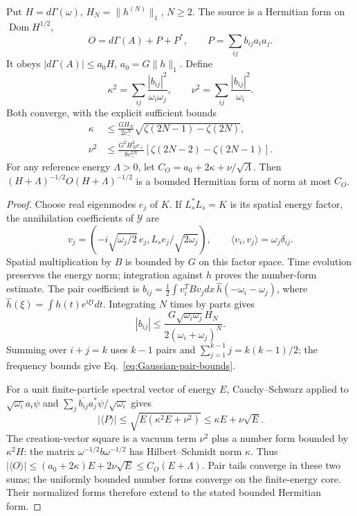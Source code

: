 \begin{proposition}
\label{prop:Gaussian-source-certificate}
Put $H=d\Gamma(\omega)$, $H_N=\|h^{(N)}\|_1$, $N\ge2$.
The source is a Hermitian form on $\operatorname{Dom}H^{1/2}$,
\[
 O=d\Gamma(A)+P+P^*,\qquad P=\sum_{ij}b_{ij}a_i a_j.
\]
It obeys $|d\Gamma(A)|\le a_0H$, $a_0=G\|h\|_1$.
Define
\[
 \kappa^2=\sum_{ij}\frac{|b_{ij}|^2}{\omega_i\omega_j},\qquad
 \nu^2=\sum_{ij}\frac{|b_{ij}|^2}{\omega_i}.
\]
Both converge, with the explicit sufficient bounds
\begin{align}
 \kappa&\le \frac{GH_N}{2c_-^N}
       \sqrt{\zeta(2N-1)-\zeta(2N)},\nonumber\\
 \nu^2&\le \frac{G^2H_N^2c_+}{8c_-^{2N}}
       [\zeta(2N-2)-\zeta(2N-1)].
 \label{eq:Gaussian-pair-bounds}
\end{align}
For any reference energy $\Lambda>0$, let
$C_O=a_0+2\kappa+\nu/\sqrt\Lambda$.
Then $(H+\Lambda)^{-1/2}O(H+\Lambda)^{-1/2}$ is a bounded
Hermitian form of norm at most $C_O$.
\end{proposition}
\begin{proof}
Choose real eigenmodes $e_j$ of $K$. If $L_s^*L_s=K$ is its
spatial energy factor, the annihilation coefficients of $\mathcal Y$
are
\[
 v_j=(-i\sqrt{\omega_j/2}\,e_j,
                       L_se_j/\sqrt{2\omega_j}),\qquad
 \langle v_i,v_j\rangle=\omega_j\delta_{ij}.
\]
Spatial multiplication by $B$ is bounded by $G$ on this factor
space. Time evolution preserves the energy norm; integration against
$h$ proves the number-form estimate.
The pair coefficient is
$b_{ij}=\tfrac12\int v_i^TBv_jdx\,\widehat h(-\omega_i-\omega_j)$,
where $\widehat h(\xi)=\int h(t)e^{i\xi t}dt$.
Integrating $N$ times by parts gives
\[
 |b_{ij}|\le \frac{G\sqrt{\omega_i\omega_j}H_N}
                         {2(\omega_i+\omega_j)^N}.
\]
Summing over $i+j=k$ uses $k-1$ pairs and
$\sum_{j=1}^{k-1}j=k(k-1)/2$; the frequency bounds give
Eq.~\eqref{eq:Gaussian-pair-bounds}.

For a unit finite-particle spectral vector of energy $E$,
Cauchy--Schwarz applied to $\sqrt{\omega_i}a_i\psi$ and
$\sum_j\overline{b_{ij}}a_j^*\psi/\sqrt{\omega_i}$ gives
\[
 |\langle P\rangle|\le\sqrt{E(\kappa^2E+\nu^2)}
                         \le\kappa E+\nu\sqrt E.
\]
The creation-vector square is a vacuum term $\nu^2$ plus a number
form bounded by $\kappa^2H$: the matrix
$\omega^{-1/2}b\omega^{-1/2}$ has Hilbert--Schmidt norm $\kappa$.
Thus $|\langle O\rangle|\le(a_0+2\kappa)E+2\nu\sqrt E
\le C_O(E+\Lambda)$.
Pair tails converge in these two sums; the uniformly bounded number
forms converge on the finite-energy core. Their normalized forms
therefore extend to the stated bounded Hermitian form.
\end{proof}

